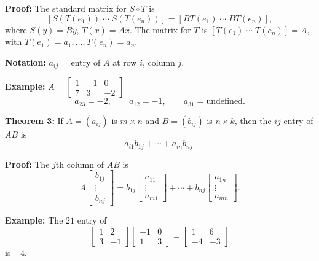 \documentclass{article}
\begin{document}
\textbf{Proof:} The standard matrix for $S \circ T$ is
\[
[S(T(e_1)) \; \cdots \; S(T(e_n))] = [BT(e_1) \; \cdots \; BT(e_n)],
\]
where $S(y) = By$, $T(x) = Ax$.
The matrix for $T$ is $[T(e_1) \; \cdots \; T(e_n)] = A$, with $T(e_1) = a_1, \ldots, T(e_n) = a_n$.

\bigskip

\textbf{Notation:} $a_{ij}$ = entry of $A$ at row $i$, column $j$.

\medskip

\textbf{Example:} $A = \begin{bmatrix} 1 & -1 & 0 \\ 7 & 3 & -2 \end{bmatrix}$
\[
a_{23} = -2, \qquad a_{12} = -1, \qquad a_{31} = \text{undefined}.
\]

\newpage

\textbf{Theorem 3:} If $A = (a_{ij})$ is $m \times n$ and $B = (b_{ij})$ is $n \times k$, then the $ij$ entry of $AB$ is
\[
a_{i1}b_{1j} + \cdots + a_{in}b_{nj}.
\]

\medskip

\textbf{Proof:} The $j$th column of $AB$ is
\[
A \begin{bmatrix} b_{1j} \\ \vdots \\ b_{nj} \end{bmatrix}
= b_{1j} \begin{bmatrix} a_{11} \\ \vdots \\ a_{m1} \end{bmatrix} + \cdots + b_{nj} \begin{bmatrix} a_{1n} \\ \vdots \\ a_{mn} \end{bmatrix}.
\]

\bigskip

\textbf{Example:} The $21$ entry of
\[
\begin{bmatrix} 1 & 2 \\ 3 & -1 \end{bmatrix} \begin{bmatrix} -1 & 0 \\ 1 & 3 \end{bmatrix} = \begin{bmatrix} 1 & 6 \\ -4 & -3 \end{bmatrix}
\]
is $\boxed{-4}$.

\bigskip
\end{document}

